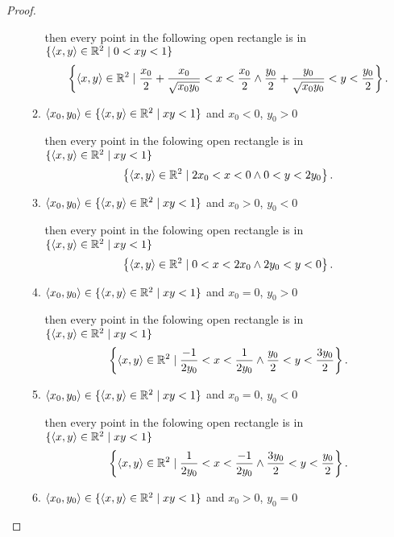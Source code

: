 \begin{proof}
\begin{enumerate}[label={(\roman*)}]
\begin{enumerate}[label={\textbf{Case \arabic*.}},itemindent=1cm]
			            then every point in the following open rectangle is in $\{ \left\langle{x, y}\right\rangle\in \mathbb{R}^{2} \mid 0 < xy < 1 \}$
			            \[
				            \left\{ \left\langle{x, y}\right\rangle\in \mathbb{R}^{2} \mid \frac{x_{0}}{2} + \frac{x_{0}}{\sqrt{x_{0}y_{0}}} < x < \frac{x_{0}}{2} \wedge \frac{y_{0}}{2} + \frac{y_{0}}{\sqrt{x_{0}y_{0}}} < y < \frac{y_{0}}{2} \right\}.
			            \]

			      \item $\left\langle{x_{0}, y_{0}}\right\rangle\in \{ \left\langle{x, y}\right\rangle\in \mathbb{R}^{2} \mid xy < 1 \}$ and $x_{0} < 0$, $y_{0} > 0$

			            then every point in the folowing open rectangle is in $\{ \left\langle{x, y}\right\rangle\in \mathbb{R}^{2} \mid xy < 1 \}$
			            \[
				            \left\{ \left\langle{x, y}\right\rangle\in\mathbb{R}^{2} \mid 2x_{0} < x < 0 \wedge 0 < y < 2y_{0} \right\}.
			            \]

			      \item $\left\langle{x_{0}, y_{0}}\right\rangle\in \{ \left\langle{x, y}\right\rangle\in \mathbb{R}^{2} \mid xy < 1 \}$ and $x_{0} > 0$, $y_{0} < 0$

			            then every point in the folowing open rectangle is in $\{ \left\langle{x, y}\right\rangle\in \mathbb{R}^{2} \mid xy < 1 \}$
			            \[
				            \left\{ \left\langle{x, y}\right\rangle\in\mathbb{R}^{2} \mid 0 < x < 2x_{0} \wedge 2y_{0} < y < 0 \right\}.
			            \]

			      \item $\left\langle{x_{0}, y_{0}}\right\rangle\in \{ \left\langle{x, y}\right\rangle\in \mathbb{R}^{2} \mid xy < 1 \}$ and $x_{0} = 0$, $y_{0} > 0$

			            then every point in the folowing open rectangle is in $\{ \left\langle{x, y}\right\rangle\in \mathbb{R}^{2} \mid xy < 1 \}$
			            \[
				            \left\{ \left\langle{x, y}\right\rangle\in \mathbb{R}^{2} \mid \frac{-1}{2y_{0}} < x < \frac{1}{2y_{0}} \wedge \frac{y_{0}}{2} < y < \frac{3y_{0}}{2} \right\}.
			            \]
			      \item $\left\langle{x_{0}, y_{0}}\right\rangle\in \{ \left\langle{x, y}\right\rangle\in \mathbb{R}^{2} \mid xy < 1 \}$ and $x_{0} = 0$, $y_{0} < 0$

			            then every point in the folowing open rectangle is in $\{ \left\langle{x, y}\right\rangle\in \mathbb{R}^{2} \mid xy < 1 \}$
			            \[
				            \left\{ \left\langle{x, y}\right\rangle\in \mathbb{R}^{2} \mid \frac{1}{2y_{0}} < x < \frac{-1}{2y_{0}} \wedge \frac{3y_{0}}{2} < y < \frac{y_{0}}{2} \right\}.
			            \]
			      \item $\left\langle{x_{0}, y_{0}}\right\rangle\in \{ \left\langle{x, y}\right\rangle\in \mathbb{R}^{2} \mid xy < 1 \}$ and $x_{0} > 0$, $y_{0} = 0$


\end{enumerate}
\end{enumerate}
\end{proof}
